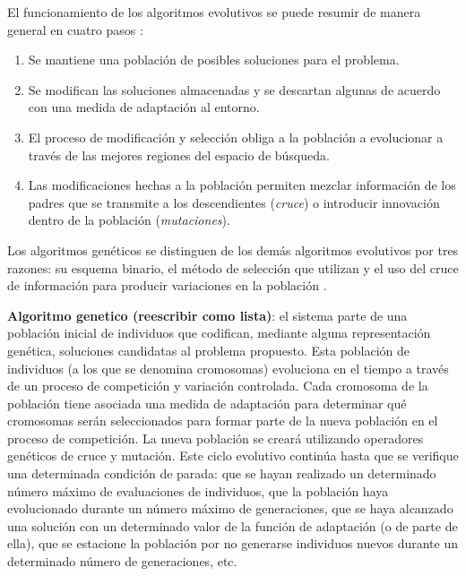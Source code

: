 \documentclass[12pt]{article}
\theoremstyle{bfTheoremWithNote}
\theoremstyle{bfRemark}
\begin{document}
    El funcionamiento de los algoritmos evolutivos se puede resumir de manera general en cuatro pasos \cite{IMD2004}:
    \begin{enumerate}
        \item Se mantiene una población de posibles soluciones para el problema.
        \item Se modifican las soluciones almacenadas y se descartan algunas de acuerdo con una medida de adaptación al entorno.
        \item El proceso de modificación y selección obliga a la población a evolucionar a través de las mejores regiones del espacio de búsqueda.
        \item Las modificaciones hechas a la población permiten mezclar información de los padres que se transmite a los descendientes (\textit{cruce}) o introducir innovación dentro de la población (\textit{mutaciones}).
    \end{enumerate}

    Los algoritmos genéticos se distinguen de los demás algoritmos evolutivos por tres razones: su esquema binario, el método de selección que utilizan y el uso del cruce de información para producir variaciones en la población \cite{IMD2004}. 

    \textbf{Algoritmo genetico (reescribir como lista)}: el sistema parte de una población inicial de individuos que codifican, mediante alguna representación genética, soluciones candidatas al problema propuesto. Esta población de individuos (a los que se denomina cromosomas) evoluciona en el tiempo a través de un proceso de competición y variación controlada. Cada cromosoma de la población tiene asociada una medida de adaptación para determinar qué cromosomas serán seleccionados para formar parte de la nueva población en el proceso de competición. La nueva población se creará utilizando operadores genéticos de cruce y mutación. Este ciclo evolutivo continúa hasta que se verifique una determinada condición de parada: que se hayan realizado un determinado número máximo de evaluaciones de individuos, que la población haya evolucionado durante un número máximo de generaciones, que se haya alcanzado una solución con un determinado valor de la función de adaptación (o de parte de ella), que se estacione la población por no generarse individuos nuevos durante un determinado número de generaciones, etc. 
\end{document}
